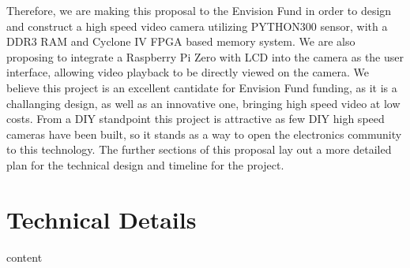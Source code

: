 \documentclass[12pt]{article}
\begin{document}
Therefore, we are making this proposal to the Envision Fund in order to design and construct a high speed video camera utilizing PYTHON300 sensor, with a DDR3 RAM and Cyclone IV FPGA based memory system. We are also proposing to integrate a Raspberry Pi Zero with LCD into the camera as the user interface, allowing video playback to be directly viewed on the camera. We believe this project is an excellent cantidate for Envision Fund funding, as it is a challanging design, as well as an innovative one, bringing high speed video at low costs. From a DIY standpoint this project is attractive as few DIY high speed cameras have been built, so it stands as a way to open the electronics community to this technology. The further sections of this proposal lay out a more detailed plan for the technical design and timeline for the project.

\section{Technical Details}
content
\end{document}
